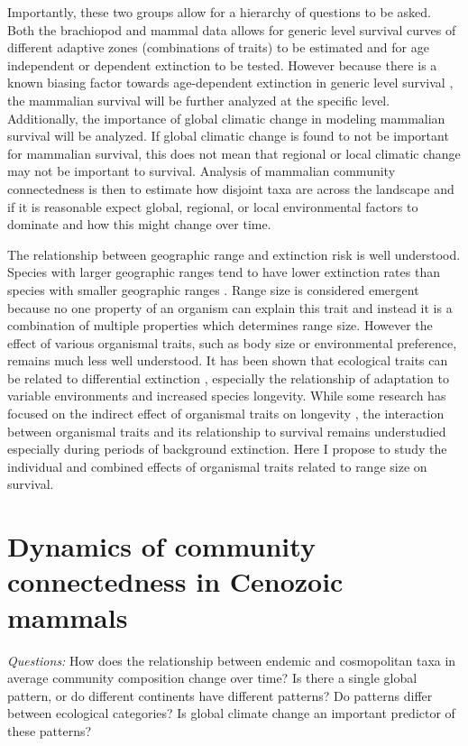 \documentclass[12pt,letterpaper]{article}
\begin{document}
Importantly, these two groups allow for a hierarchy of questions to be asked. Both the brachiopod and mammal data allows for generic level survival curves of different adaptive zones (combinations of traits) to be estimated and for age independent or dependent extinction to be tested. However because there is a known biasing factor towards age-dependent extinction in generic level survival \citep{Simpson2006,Raup1978,Raup1991a}, the mammalian survival will be further analyzed at the specific level. Additionally, the importance of global climatic change in modeling mammalian survival will be analyzed. If global climatic change is found to not be important for mammalian survival, this does not mean that regional or local climatic change may not be important to survival. Analysis of mammalian community connectedness is then to estimate how disjoint taxa are across the landscape and if it is reasonable expect global, regional, or local environmental factors to dominate and how this might change over time.

The relationship between geographic range and extinction risk is well understood. Species with larger geographic ranges tend to have lower extinction rates than species with smaller geographic ranges \citep{Jablonski1986,Harnik2013,Nurnberg2013a,Jablonski2003,Roy2009c}. Range size is considered emergent because no one property of an organism can explain this trait and instead it is a combination of multiple properties which determines range size. However the effect of various organismal traits, such as body size or environmental preference, remains much less well understood. It has been shown that ecological traits can be related to differential extinction \citep{Foote2013,Liow2007b,Baumiller1993,Nurnberg2013a}, especially the relationship of adaptation to variable environments and increased species longevity. While some research has focused on the indirect effect of organismal traits on longevity \citep{Harnik2011}, the interaction between organismal traits and its relationship to survival remains understudied especially during periods of background extinction. Here I propose to study the individual and combined effects of organismal traits related to range size on survival.


\section{Dynamics of community connectedness in Cenozoic mammals}

\textit{Questions:} 
How does the relationship between endemic and cosmopolitan taxa in average community composition change over time? Is there a single global pattern, or do different continents have different patterns? Do patterns differ between ecological categories? Is global climate change an important predictor of these patterns?
\end{document}
